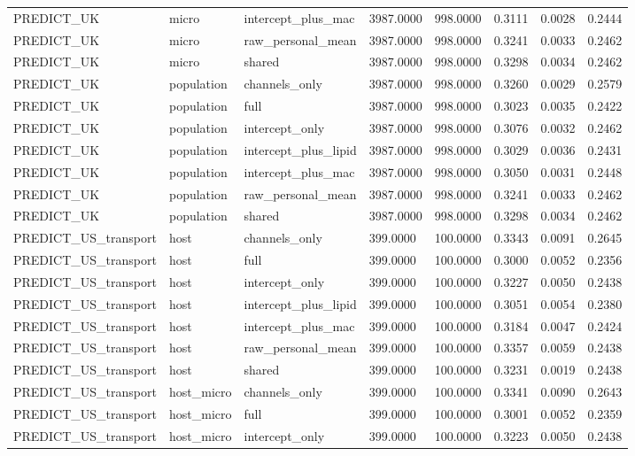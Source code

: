 {\begin{longtable}{llllllll}
PREDICT\_UK & micro & intercept\_plus\_mac & 3987.0000 & 998.0000 & 0.3111 & 0.0028 & 0.2444 \\
PREDICT\_UK & micro & raw\_personal\_mean & 3987.0000 & 998.0000 & 0.3241 & 0.0033 & 0.2462 \\
PREDICT\_UK & micro & shared & 3987.0000 & 998.0000 & 0.3298 & 0.0034 & 0.2462 \\
PREDICT\_UK & population & channels\_only & 3987.0000 & 998.0000 & 0.3260 & 0.0029 & 0.2579 \\
PREDICT\_UK & population & full & 3987.0000 & 998.0000 & 0.3023 & 0.0035 & 0.2422 \\
PREDICT\_UK & population & intercept\_only & 3987.0000 & 998.0000 & 0.3076 & 0.0032 & 0.2462 \\
PREDICT\_UK & population & intercept\_plus\_lipid & 3987.0000 & 998.0000 & 0.3029 & 0.0036 & 0.2431 \\
PREDICT\_UK & population & intercept\_plus\_mac & 3987.0000 & 998.0000 & 0.3050 & 0.0031 & 0.2448 \\
PREDICT\_UK & population & raw\_personal\_mean & 3987.0000 & 998.0000 & 0.3241 & 0.0033 & 0.2462 \\
PREDICT\_UK & population & shared & 3987.0000 & 998.0000 & 0.3298 & 0.0034 & 0.2462 \\
PREDICT\_US\_transport & host & channels\_only & 399.0000 & 100.0000 & 0.3343 & 0.0091 & 0.2645 \\
PREDICT\_US\_transport & host & full & 399.0000 & 100.0000 & 0.3000 & 0.0052 & 0.2356 \\
PREDICT\_US\_transport & host & intercept\_only & 399.0000 & 100.0000 & 0.3227 & 0.0050 & 0.2438 \\
PREDICT\_US\_transport & host & intercept\_plus\_lipid & 399.0000 & 100.0000 & 0.3051 & 0.0054 & 0.2380 \\
PREDICT\_US\_transport & host & intercept\_plus\_mac & 399.0000 & 100.0000 & 0.3184 & 0.0047 & 0.2424 \\
PREDICT\_US\_transport & host & raw\_personal\_mean & 399.0000 & 100.0000 & 0.3357 & 0.0059 & 0.2438 \\
PREDICT\_US\_transport & host & shared & 399.0000 & 100.0000 & 0.3231 & 0.0019 & 0.2438 \\
PREDICT\_US\_transport & host\_micro & channels\_only & 399.0000 & 100.0000 & 0.3341 & 0.0090 & 0.2643 \\
PREDICT\_US\_transport & host\_micro & full & 399.0000 & 100.0000 & 0.3001 & 0.0052 & 0.2359 \\
PREDICT\_US\_transport & host\_micro & intercept\_only & 399.0000 & 100.0000 & 0.3223 & 0.0050 & 0.2438 \\

\end{longtable}}
